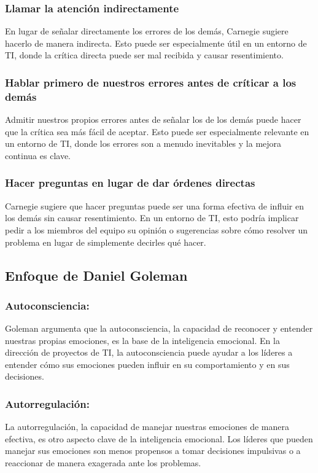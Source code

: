 \documentclass[journal]{IEEEtran}
\begin{document}
\subsubsection{Llamar la atención indirectamente}
En lugar de señalar directamente los errores de los demás, Carnegie sugiere hacerlo de manera indirecta. Esto puede ser especialmente útil en un entorno de TI, donde la crítica directa puede ser mal recibida y causar resentimiento.
 
\subsubsection{Hablar primero de nuestros errores antes de críticar a los demás}
Admitir nuestros propios errores antes de señalar los de los demás puede hacer que la crítica sea más fácil de aceptar. Esto puede ser especialmente relevante en un entorno de TI, donde los errores son a menudo inevitables y la mejora continua es clave.
 
\subsubsection{Hacer preguntas en lugar de dar órdenes directas}
Carnegie sugiere que hacer preguntas puede ser una forma efectiva de influir en los demás sin causar resentimiento. En un entorno de TI, esto podría implicar pedir a los miembros del equipo su opinión o sugerencias sobre cómo resolver un problema en lugar de simplemente decirles qué hacer.
 
\subsection{Enfoque de Daniel Goleman}
 
\subsubsection{Autoconsciencia:} Goleman argumenta que la autoconsciencia, la capacidad de reconocer y entender nuestras propias emociones, es la base de la inteligencia emocional. En la dirección de proyectos de TI, la autoconsciencia puede ayudar a los líderes a entender cómo sus emociones pueden influir en su comportamiento y en sus decisiones.
\subsubsection{Autorregulación:} La autorregulación, la capacidad de manejar nuestras emociones de manera efectiva, es otro aspecto clave de la inteligencia emocional. Los líderes que pueden manejar sus emociones son menos propensos a tomar decisiones impulsivas o a reaccionar de manera exagerada ante los problemas.
\end{document}

